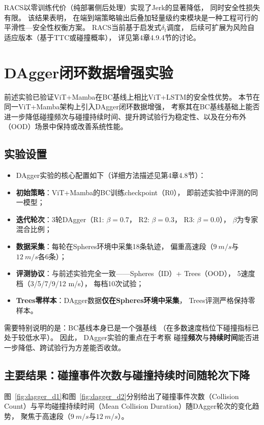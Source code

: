 RACS以零训练代价（纯部署侧后处理）实现了Jerk的显著降低，
同时安全性损失有限。
该结果表明，
在端到端策略输出后叠加轻量级约束模块是一种工程可行的平滑性—安全性权衡方案。
RACS当前基于启发式$\delta_t$调度，
后续可扩展为风险自适应版本（基于TTC或碰撞概率），
详见第4章4.9.4节的讨论。


\section{DAgger闭环数据增强实验}

前述实验已验证ViT+Mamba在BC基线上相比ViT+LSTM的安全性优势。
本节在同一ViT+Mamba架构上引入DAgger闭环数据增强，
考察其在BC基线基础上能否进一步降低碰撞频次与碰撞持续时间、提升跨试验行为稳定性、以及在分布外（OOD）场景中保持或改善系统性能。

\subsection{实验设置}

\begin{itemize}
\item DAgger实验的核心配置如下（详细方法描述见第4章4.8节）：
\item \textbf{初始策略}：ViT+Mamba的BC训练checkpoint（R0），
即前述实验中评测的同一模型；
 \item \textbf{迭代轮次}：3轮DAgger（R1: $\beta=0.7$，
R2: $\beta=0.3$，
R3: $\beta=0.0$），
$\beta$为专家混合比例；
 \item \textbf{数据采集}：每轮在Spheres环境中采集18条轨迹，
偏重高速段（$\SI{9}{m/s}$与$\SI{12}{m/s}$各6条）；
 \item \textbf{评测协议}：与前述实验完全一致——Spheres（ID）+ Trees（OOD），
5速度档（3/5/7/9/12 m/s），
每档10次试验；
 \item \textbf{Trees零样本}：DAgger数据\textbf{仅在Spheres环境中采集}，
Trees评测严格保持零样本。
 \end{itemize}

需要特别说明的是：BC基线本身已是一个强基线
（在多数速度档位下碰撞指标已处于较低水平）。
因此，
DAgger实验的重点在于考察
碰撞\textbf{频次}与\textbf{持续时间}能否进一步降低、跨试验行为方差能否收敛。

\subsection{主要结果：碰撞事件次数与碰撞持续时间随轮次下降}

图~\ref{fig:dagger_d1}和图~\ref{fig:dagger_d2}分别给出了碰撞事件次数（Collision Count）与平均碰撞持续时间（Mean Collision Duration）随DAgger轮次的变化趋势，
聚焦于高速段（$\SI{9}{m/s}$与$\SI{12}{m/s}$）。

